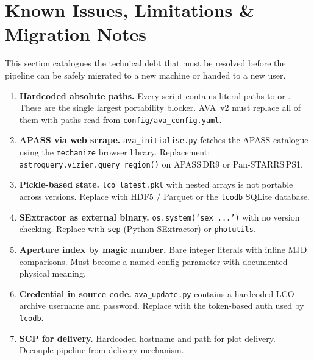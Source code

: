 \documentclass[12pt,a4paper]{article}
\begin{document}

\section{Known Issues, Limitations \& Migration Notes}
\label{sec:issues}

This section catalogues the technical debt that must be resolved before the pipeline can
be safely migrated to a new machine or handed to a new user.

\begin{enumerate}

\item \textbf{Hardcoded absolute paths.}  Every script contains literal paths to
       or .  These are the single
      largest portability blocker.  AVA~v2 must replace all of them with paths read from
      \texttt{config/ava\_config.yaml}.

\item \textbf{APASS via web scrape.}  \texttt{ava\_initialise.py} fetches the APASS
      catalogue using the \texttt{mechanize} browser library.  Replacement:
      \texttt{astroquery.vizier.query\_region()} on APASS\,DR9 or Pan-STARRS\,PS1.

\item \textbf{Pickle-based state.}  \texttt{lco\_latest.pkl} with nested arrays is not
      portable across versions.  Replace with HDF5 / Parquet or the \texttt{lcodb}
      SQLite database.

\item \textbf{SExtractor as external binary.}  \texttt{os.system(`sex ...')} with no
      version checking.  Replace with \texttt{sep} (Python SExtractor) or
      \texttt{photutils}.

\item \textbf{Aperture index by magic number.}  Bare integer literals with inline MJD
      comparisons.  Must become a named config parameter with documented physical meaning.

\item \textbf{Credential in source code.}  \texttt{ava\_update.py} contains a hardcoded
      LCO archive username and password.  Replace with the token-based auth used by
      \texttt{lcodb}.

\item \textbf{SCP for delivery.}  Hardcoded hostname and path for plot delivery.
      Decouple pipeline from delivery mechanism.


\end{enumerate}
\end{document}
